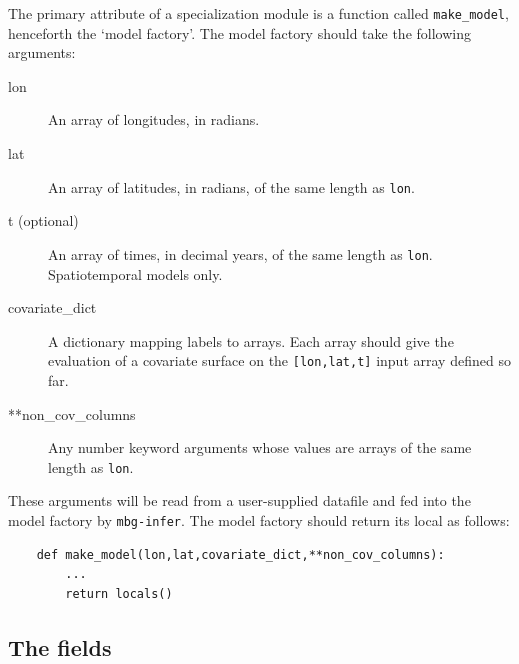 The primary attribute of a specialization module is a function called \texttt{make\_model}, henceforth the `model factory'. The model factory should take the following arguments:
\begin{description}
    \item[lon] An array of longitudes, in radians.
    \item[lat] An array of latitudes, in radians, of the same length as \texttt{lon}.
    \item[t (optional)] An array of times, in decimal years, of the same length as \texttt{lon}. Spatiotemporal models only.
    \item[covariate\_dict] A dictionary mapping labels to arrays. Each array should give the evaluation of a covariate surface on the \texttt{[lon,lat,t]} input array defined so far.
    \item[**non\_cov\_columns] Any number keyword arguments whose values are arrays of the same length as \texttt{lon}.
\end{description}
These arguments will be read from a user-supplied datafile and fed into the model factory by \texttt{mbg-infer}. The model factory should return its local as follows: 
\begin{verbatim}
    def make_model(lon,lat,covariate_dict,**non_cov_columns):
        ...
        return locals()
\end{verbatim}

\subsection{The fields}

